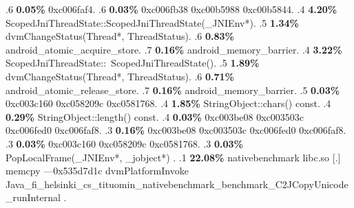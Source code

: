 \begin{profile}
{.6 \textbf{0.05\%} 0xc006faf4. 
.6 \textbf{0.03\%} 0xc006fb38\newline {} 0xc00b5988\newline {} 0xc00b5844. 
.4 \textbf{4.20\%} ScopedJniThreadState::ScopedJniThreadState(\_JNIEnv*). 
.5 \textbf{1.34\%} dvmChangeStatus(Thread*, ThreadStatus). 
.6 \textbf{0.83\%} android\_atomic\_acquire\_store. 
.7 \textbf{0.16\%} android\_memory\_barrier. 
.4 \textbf{3.22\%} ScopedJniThreadState::~ScopedJniThreadState(). 
.5 \textbf{1.89\%} dvmChangeStatus(Thread*, ThreadStatus). 
.6 \textbf{0.71\%} android\_atomic\_release\_store. 
.7 \textbf{0.16\%} android\_memory\_barrier. 
.5 \textbf{0.03\%} 0xc003c160\newline {} 0xc058209c\newline {} 0xc0581768. 
.4 \textbf{1.85\%} StringObject::chars() const. 
.4 \textbf{0.29\%} StringObject::length() const. 
.4 \textbf{0.03\%} 0xc003be08\newline {} 0xc003503c\newline {} 0xc006fed0\newline {} 0xc006faf8. 
.3 \textbf{0.16\%} 0xc003be08\newline {} 0xc003503c\newline {} 0xc006fed0\newline {} 0xc006faf8. 
.3 \textbf{0.03\%} 0xc003c160\newline {} 0xc058209c\newline {} 0xc0581768. 
.3 \textbf{0.03\%} PopLocalFrame(\_JNIEnv*, \_jobject*)\newline {} . 
.1 \textbf{22.08\%} nativebenchmark  libc.so                [.] memcpy\newline {} ---0x535d7d1c\newline {} dvmPlatformInvoke\newline {} Java\_fi\_helsinki\_cs\_tituomin\_nativebenchmark\_benchmark\_C2JCopyUnicode\_runInternal\newline {} . 
}
\end{profile}

